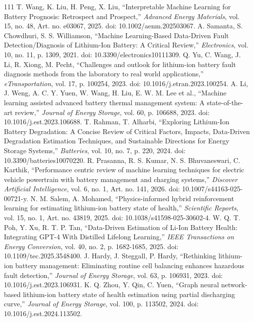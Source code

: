 \documentclass[journal]{IEEEtran}
\begin{document}
\begin{thebibliography}{111}
T. Wang, K. Liu, H. Peng, X. Liu, ``Interpretable Machine Learning for Battery Prognosis: Retrospect and Prospect,'' \emph{Advanced Energy Materials}, vol. 15, no. 48, Art. no. e03067, 2025. doi: 10.1002/aenm.202503067.
A. Samanta, S. Chowdhuri, S. S. Williamson, ``Machine Learning-Based Data-Driven Fault Detection/Diagnosis of Lithium-Ion Battery: A Critical Review,'' \emph{Electronics}, vol. 10, no. 11, p. 1309, 2021. doi: 10.3390/electronics10111309.
Q. Yu, C. Wang, J. Li, R. Xiong, M. Pecht, ``Challenges and outlook for lithium-ion battery fault diagnosis methods from the laboratory to real world applications,'' \emph{eTransportation}, vol. 17, p. 100254, 2023. doi: 10.1016/j.etran.2023.100254.
A. Li, J. Weng, A. C. Y. Yuen, W. Wang, H. Liu, E. W. M. Lee et al., ``Machine learning assisted advanced battery thermal management system: A state-of-the-art review,'' \emph{Journal of Energy Storage}, vol. 60, p. 106688, 2023. doi: 10.1016/j.est.2023.106688.
T. Rahman, T. Alharbi, ``Exploring Lithium-Ion Battery Degradation: A Concise Review of Critical Factors, Impacts, Data-Driven Degradation Estimation Techniques, and Sustainable Directions for Energy Storage Systems,'' \emph{Batteries}, vol. 10, no. 7, p. 220, 2024. doi: 10.3390/batteries10070220.
R. Prasanna, R. S. Kumar, N. S. Bhuvaneswari, C. Karthik, ``Performance centric review of machine learning techniques for electric vehicle powertrain with battery management and charging systems,'' \emph{Discover Artificial Intelligence}, vol. 6, no. 1, Art. no. 141, 2026. doi: 10.1007/s44163-025-00721-y.
N. M. Salem, A. Mohamed, ``Physics-informed hybrid reinforcement learning for estimating lithium-ion battery state of health,'' \emph{Scientific Reports}, vol. 15, no. 1, Art. no. 43819, 2025. doi: 10.1038/s41598-025-30602-4.
W. Q. T. Poh, Y. Xu, R. T. P. Tan, ``Data-Driven Estimation of Li-Ion Battery Health: Integrating GPT-4 With Distilled Lifelong Learning,'' \emph{IEEE Transactions on Energy Conversion}, vol. 40, no. 2, p. 1682-1685, 2025. doi: 10.1109/tec.2025.3548400.
J. Hardy, J. Steggall, P. Hardy, ``Rethinking lithium-ion battery management: Eliminating routine cell balancing enhances hazardous fault detection,'' \emph{Journal of Energy Storage}, vol. 63, p. 106931, 2023. doi: 10.1016/j.est.2023.106931.
K. Q. Zhou, Y. Qin, C. Yuen, ``Graph neural network-based lithium-ion battery state of health estimation using partial discharging curve,'' \emph{Journal of Energy Storage}, vol. 100, p. 113502, 2024. doi: 10.1016/j.est.2024.113502.

\end{thebibliography}
\end{document}
